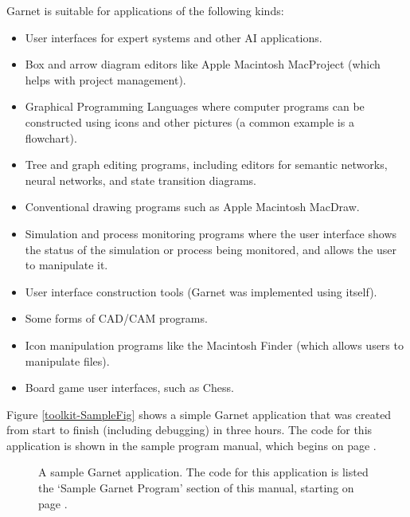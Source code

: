 \documentclass{report}
\begin{document}
Garnet is suitable for applications of the following kinds:
\begin{itemize}
\item User interfaces for expert systems and other AI applications.
  
\item Box and arrow diagram editors like Apple Macintosh MacProject
  (which helps with project management).
  
\item Graphical Programming Languages where computer programs can be
  constructed using icons and other pictures (a common example is a
  flowchart).
  
\item Tree and graph editing programs, including editors for semantic
  networks, neural networks, and state transition diagrams.
  
\item Conventional drawing programs such as Apple Macintosh MacDraw.
  
\item Simulation and process monitoring programs where the user
  interface shows the status of the simulation or process being
  monitored, and allows the user to manipulate it.
  
\item User interface construction tools (Garnet was implemented using
  itself).
  
\item Some forms of CAD/CAM programs.
  
\item Icon manipulation programs like the Macintosh Finder (which
  allows users to manipulate files).
  
\item Board game user interfaces, such as Chess.
\end{itemize}

Figure \ref{toolkit-SampleFig} shows a simple Garnet application that
was created from start to finish (including debugging) in three hours.
The code for this application is shown in the sample program manual,
which begins on page \pageref{sampleprog-first-page}.

\begin{figure}
\centerline{}
\caption{A sample Garnet application.  The code for this application is
  listed the `Sample Garnet Program' section of this manual, starting
  on page \pageref{sampleprog-first-page}.}  \label{fig:toolkit-SampleFig}
\end{figure}
\end{document}
